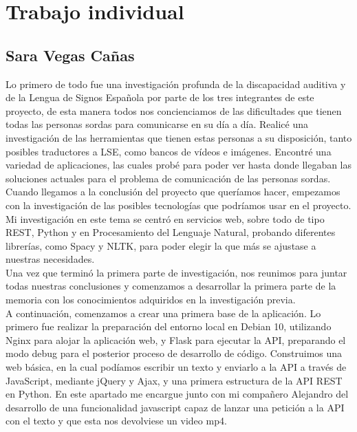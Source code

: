 %
%

\chapter{Trabajo individual}


\section{Sara Vegas Cañas}
\label{capTrabajoIndividual:sec:Sara}

Lo primero de todo fue una investigación profunda de la discapacidad auditiva y de la Lengua de Signos Española por parte de los tres integrantes de este proyecto, de esta manera todos nos concienciamos de las dificultades que tienen todas las personas sordas para comunicarse en su día a día. Realicé una investigación de las herramientas que tienen estas personas a su disposición, tanto posibles traductores a LSE, como bancos de vídeos e imágenes. Encontré una variedad de aplicaciones, las cuales probé para poder ver hasta donde llegaban las soluciones actuales para el problema de comunicación de las personas sordas. \\

Cuando llegamos a la conclusión del proyecto que queríamos hacer, empezamos con la investigación de las posibles tecnologías que podríamos usar en el proyecto. Mi investigación en este tema se centró en servicios web, sobre todo de tipo REST, Python y en Procesamiento del Lenguaje Natural, probando diferentes librerías, como Spacy y NLTK, para poder elegir la que más se ajustase a nuestras necesidades.\\

Una vez que terminó la primera parte de investigación, nos reunimos para juntar todas nuestras conclusiones y comenzamos a desarrollar la primera parte de la memoria con los conocimientos adquiridos en la investigación previa.\\

A continuación, comenzamos a crear una primera base de la aplicación. Lo primero fue realizar la preparación del entorno local en Debian 10, utilizando Nginx para alojar la aplicación web, y Flask para ejecutar la API, preparando el modo debug para el posterior proceso de desarrollo de código. Construimos una web básica, en la cual podíamos escribir un texto y enviarlo a la API a través de JavaScript, mediante jQuery y Ajax, y una primera estructura de la API REST en Python. En este apartado me encargue junto con mi compañero Alejandro del desarrollo de una funcionalidad javascript capaz de lanzar una petición a la API con el texto y que esta nos devolviese un video mp4.\\


